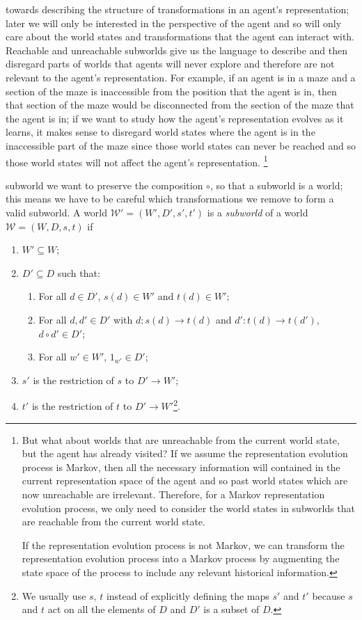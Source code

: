  towards describing the structure of transformations in an agent's representation; later we will only be interested in the perspective of the agent and so will only care about the world states and transformations that the agent can interact with.
Reachable and unreachable subworlds give us the language to describe and then disregard parts of worlds that agents will never explore and therefore are not relevant to the agent's representation.
For example, if an agent is in a maze and a section of the maze is inaccessible from the position that the agent is in, then that section of the maze would be disconnected from the section of the maze that the agent is in; if we want to study how the agent’s representation evolves as it learns, it makes sense to disregard world states where the agent is in the inaccessible part of the maze since those world states can never be reached and so those world states will not affect the agent's representation.
\footnote{
	But what about worlds that are unreachable from the current world state, but the agent has already visited?
	If we assume the representation evolution process is Markov, then all the necessary information will contained in the current representation space of the agent and so past world states which are now unreachable are irrelevant.
	Therefore, for a Markov representation evolution process, we only need to consider the world states in subworlds that are reachable from the current world state.

	If the representation evolution process is not Markov, we can transform the representation evolution process into a Markov process by augmenting the state space of the process to include any relevant historical information.
}


 subworld we want to preserve the composition $\circ$, so that a subworld is a world; this means we have to be careful which transformations we remove to form a valid subworld.
A world $\mathscr{W}' = (W', D', s', t')$ is a \emph{subworld} of a world $\mathscr{W} = (W, D, s, t)$ if
\begin{enumerate}
    \item $W' \subseteq W$;
    \item $D' \subseteq D$ such that:
    \begin{enumerate}
        \item For all $d \in D'$, $s(d) \in W'$ and $t(d) \in W'$;
        \item For all $d, d' \in D'$ with $d: s(d) \to t(d)$ and $d': t(d) \to t(d')$, $d \circ d' \in D'$;
        \item For all $w' \in W'$, $1_{w'} \in D'$;
    \end{enumerate}
    \item $s'$ is the restriction of $s$ to $D' \to W'$;
    \item $t'$ is the restriction of $t$ to $D' \to W'$\footnote{
    We usually use $s$, $t$ instead of explicitly defining the maps $s'$ and $t'$ because $s$ and $t$ act on all the elements of $D$ and $D'$ is a subset of $D$.
    }.
\end{enumerate}

